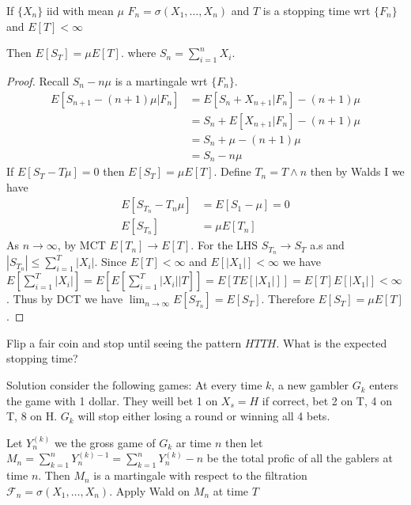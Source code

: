 \documentclass[answers,12pt,addpoints]{exam}
\begin{document}
\begin{definition}
    If $\{X_n\}$ iid with mean $\mu$ $F_n = \sigma(X_1, \ldots, X_n)$ and $T$ is a stopping time wrt $\{F_n\}$ and $E[T] < \infty$

    Then $E[S_T] = \mu E[T]$. where $S_n = \sum_{i=1}^{n} X_i$.
    \begin{proof}
        Recall $S_n - n\mu$ is a martingale wrt $\{F_n\}$.
        \begin{align*}
            E[S_{n+1} - (n+1)\mu | F_n] &= E[S_n + X_{n+1} | F_n] - (n+1)\mu \\
            &= S_n + E[X_{n+1} | F_n] - (n+1)\mu \\
            &= S_n + \mu - (n+1)\mu \\
            &= S_n - n\mu
        \end{align*}
        If $E[S_T - T\mu] = 0$ then $E[S_T] = \mu E[T]$.
        Define $T_n = T \wedge n$ then by Walds I we have
        \begin{align*}
            E[S_{T_n} - T_n \mu] &= E[S_1 - \mu] = 0 \\
            E[S_{T_n}] &= \mu E[T_n]
        \end{align*}
        As $n \to \infty$, by MCT $E[T_n] \to E[T]$. For the LHS $S_{T_n} \to S_T$ a.s and $|S_{T_n}| \leq \sum_{i=1}^{T} |X_i|$.
        Since $E[T] < \infty$ and $E[|X_1|] < \infty$ we have $E[\sum_{i=1}^{T} |X_i|] = E[E[\sum_{i=1}^{T} |X_i| | T]] = E[T E[|X_1|]] = E[T] E[|X_1|] < \infty$. Thus by DCT we have $\lim_{n \to \infty} E[S_{T_n}] = E[S_T]$. Therefore $E[S_T] = \mu E[T]$.
    \end{proof}
\end{definition}
\begin{example}
    Flip a fair coin and stop until seeing the pattern $HTTH$. What is the expected stopping time? 

    Solution consider the following games:
    At every time $k$, a new gambler $G_k$ enters the game with 1 dollar. 
    They weill bet 1 on $X_s= H$ if correct, bet 2 on T, 4 on T, 8 on H. 
    $G_k$ will stop either losing a round or winning all 4 bets.

    Let $Y_n^{(k)}$ we the gross game of $G_k$ ar time $n$ then let $M_n = \sum_{k=1}^{n} Y_n^{(k) -1} = \sum_{k=1}^n Y_n^{(k)} - n$ be the total profic of all the gablers at time $n$. Then $M_n$ is a martingale with respect to the filtration $\mathcal{F}_n = \sigma(X_1, \ldots, X_n)$.
    Apply Wald on $M_n$ at time $T$ 

\end{example}
\end{document}
